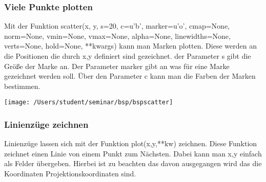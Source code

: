   \subsubsection{Viele Punkte plotten}
  Mit der Funktion \textsf{scatter(x, y, s=20, c=u'b', marker=u'o', cmap=None, norm=None, vmin=None, vmax=None, alpha=None, linewidths=None, verts=None, hold=None, **kwargs)} kann man Marken plotten. Diese werden an die Positionen die durch \textsf{x,y} definiert sind gezeichnet. der Parameter \textsf{s} gibt die Größe der Marke an. Der Parameter \textsf{marker} gibt an was für eine Marke gezeichnet werden soll. Über den Parameter \textsf{c} kann man die Farben der Marken bestimmen.
  
  \texttt{[image: /Users/student/seminar/bsp/bspscatter]}\newpage 
   \subsubsection{Linienzüge zeichnen}
   Linienzüge lassen sich mit der Funktion \textsf{plot(x,y,**kw)} zeichnen. Diese Funktion zeichnet einen Linie von einem Punkt zum Nächsten. Dabei kann man \textsf{x,y} einfach als Felder übergeben. Hierbei ist zu beachten das davon ausgegangen wird das die Koordinaten Projektionskoordinaten sind.